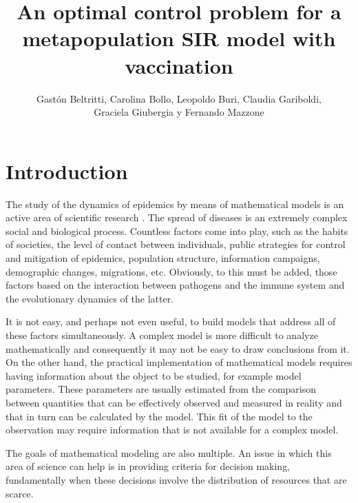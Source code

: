 \documentclass[a4paper,10pt]{article}
\title{An optimal control problem for a metapopulation SIR model with vaccination}
\author{Gastón Beltritti, Carolina Bollo, Leopoldo Buri, Claudia Gariboldi,\\ Graciela Giubergia y Fernando Mazzone}
\theoremstyle{remark}
\begin{document}
\maketitle

\begin{abstract}

\end{abstract}


\section{Introduction}


The study of the dynamics of epidemics by means of mathematical models is an active area of scientific research \cite{LindaS.Allen486,FredBrauer478,FredBrauer479,MaiaMartcheva480,FredBrauer482}. The spread of diseases is an extremely complex social and biological process. Countless factors come into play, such as the habits of societies, the level of contact between individuals, public strategies for control and mitigation of epidemics, population structure, information campaigns, demographic changes, migrations, etc. Obviously, to this must be added,   those factors based on the interaction between pathogens and the immune system and the evolutionary dynamics of the latter.

It is not easy, and perhaps not even useful, to build models that address all of these factors simultaneously. A complex model is more difficult to analyze mathematically and consequently it may not be easy to draw conclusions from it. On the other hand, the practical implementation of mathematical models requires having information about the object to be studied, for example model parameters. These parameters are usually estimated from the comparison between quantities that can be effectively observed and measured in reality and that in turn can be calculated by the model. This fit of the model to the observation may require information that is not available for a complex model.

The goals of mathematical modeling are also multiple. An issue in which this area of science can help is in providing criteria for decision making, fundamentally when these decisions involve the distribution of resources that are scarce. 

\end{document}
